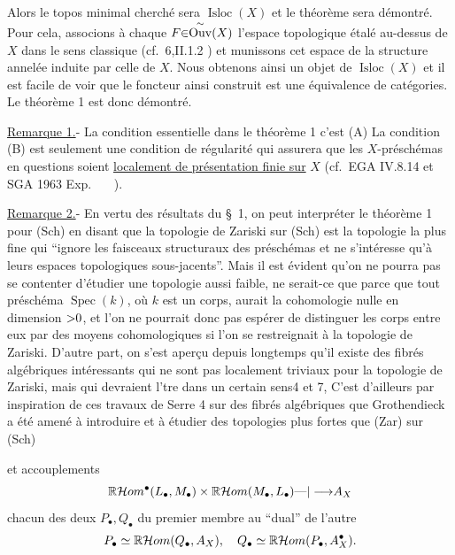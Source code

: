 
Alors le topos minimal cherché sera $\operatorname{Isloc}(X)$ et le théorème sera démontré. Pour cela, associons à chaque $F{\in}\overset{{\sim}}{\operatorname{Ouv}}(X)$ l'espace topologique étalé au-dessus de $X$ dans le sens classique (cf.\ \inserted{[}6\inserted{]},II.1.2 ) et munissons cet espace de la structure annelée induite par celle de $X$. Nous obtenons ainsi un objet de $\operatorname{Isloc}(X)$ et il est facile de voir que le foncteur ainsi construit est une équivalence de catégories. Le théorème 1 est donc démontré.

\uline{Remarque 1.}- La condition essentielle dans le théorème 1 c'est (A)
La condition (B) est seulement une condition de régularité qui assurera que les $X$-préschémas en questions soient \uline{localement de présentation finie sur} $X$ (cf.\ \inserted{[}EGA IV.8.14\inserted{]} et \inserted{[}SGA 1963 Exp.\ $\quad$\inserted{]} ).

\uline{Remarque 2.}- En vertu des résultats du \S\ 1, on peut interpréter le théorème 1 pour (Sch) en disant que la topologie de Zariski sur (Sch) est la topologie la plus fine qui ``ignore les faisceaux structuraux des préschémas et ne s'intéresse qu'à leurs espaces topologiques sous-jacents''. Mais il est évident qu'on ne pourra pas se contenter d'étudier une topologie aussi faible, ne serait-ce que parce que tout préschéma $\operatorname{Spec}(k)$, où $k$ est un corps, aurait la cohomologie nulle en dimension ${>}0$, et l'on ne pourrait donc pas espérer de distinguer les corps entre eux par des moyens cohomologiques si l'on se restreignait à la topologie de Zariski. D'autre part, on s'est aperçu depuis longtemps qu'il existe des fibrés algébriques intéressants qui ne sont pas localement triviaux pour la topologie de Zariski, mais qui devraient l'tre dans un certain sens\inserted{(voir [}4\inserted{]} et \inserted{[}7\inserted{])}, C'est d'ailleurs par inspiration de ces travaux de Serre \inserted{[}4\inserted{]} sur des fibrés algébriques que Grothendieck a été amené à introduire et à étudier des topologies plus fortes que (Zar) sur (Sch)

et  accouplements 
\[
\mathbb{R}\mathcal{H}om^\bullet(L_\bullet,M_\bullet)\times\mathbb{R}\mathcal{H}om(M_\bullet,L_\bullet){\text{---}|\longrightarrow}A_X
\]
 chacun des deux  $P_\bullet,Q_\bullet$ du premier membre au ``dual'' de l'autre
\[
P_\bullet\simeq\mathbb{R}\mathcal{H}om(Q_\bullet,A_X),\quad Q_\bullet\simeq\mathbb{R}\mathcal{H}om(P_\bullet,A_X^{{\bullet}}).
\]

